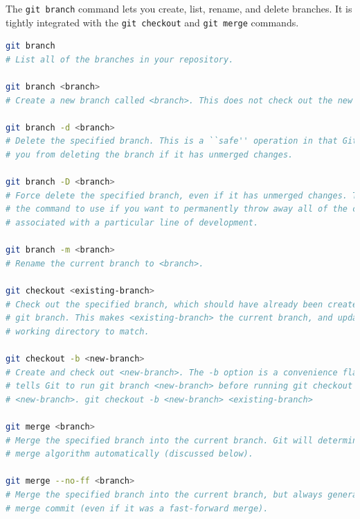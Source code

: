 The \texttt{git branch} command lets you create, list, rename, and delete branches.
It is tightly integrated with the \texttt{git checkout} and \texttt{git merge} commands.
\begin{lstlisting}[language=bash]
git branch
# List all of the branches in your repository.

git branch <branch>
# Create a new branch called <branch>. This does not check out the new branch.

git branch -d <branch>
# Delete the specified branch. This is a ``safe'' operation in that Git prevents 
# you from deleting the branch if it has unmerged changes.

git branch -D <branch>
# Force delete the specified branch, even if it has unmerged changes. This is 
# the command to use if you want to permanently throw away all of the commits 
# associated with a particular line of development.

git branch -m <branch>
# Rename the current branch to <branch>.

git checkout <existing-branch>
# Check out the specified branch, which should have already been created with 
# git branch. This makes <existing-branch> the current branch, and updates the 
# working directory to match.

git checkout -b <new-branch>
# Create and check out <new-branch>. The -b option is a convenience flag that 
# tells Git to run git branch <new-branch> before running git checkout 
# <new-branch>. git checkout -b <new-branch> <existing-branch>

git merge <branch>
# Merge the specified branch into the current branch. Git will determine the 
# merge algorithm automatically (discussed below).

git merge --no-ff <branch>
# Merge the specified branch into the current branch, but always generate a 
# merge commit (even if it was a fast-forward merge).
\end{lstlisting}
